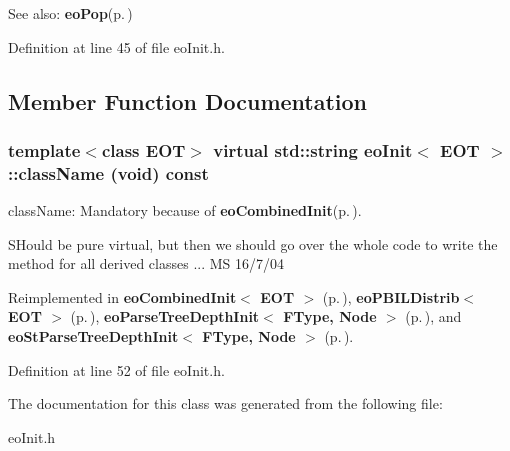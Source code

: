 \begin{Desc}
\item[See also:]{\bf eo\-Pop}{\rm (p.\,\pageref{classeo_pop})} \end{Desc}




Definition at line 45 of file eo\-Init.h.

\subsection{Member Function Documentation}
\subsubsection{\setlength{\rightskip}{0pt plus 5cm}template$<$class EOT$>$ virtual std::string {\bf eo\-Init}$<$ {\bf EOT} $>$::class\-Name (void) const\hspace{0.3cm}{\tt  [inline, virtual]}}\label{classeo_init_a0}


class\-Name: Mandatory because of {\bf eo\-Combined\-Init}{\rm (p.\,\pageref{classeo_combined_init})}. 

SHould be pure virtual, but then we should go over the whole code to write the method for all derived classes ... MS 16/7/04 

Reimplemented in {\bf eo\-Combined\-Init$<$ EOT $>$} {\rm (p.\,\pageref{classeo_combined_init_a4})}, {\bf eo\-PBILDistrib$<$ EOT $>$} {\rm (p.\,\pageref{classeo_p_b_i_l_distrib_a6})}, {\bf eo\-Parse\-Tree\-Depth\-Init$<$ FType, Node $>$} {\rm (p.\,\pageref{classeo_parse_tree_depth_init_a1})}, and {\bf eo\-St\-Parse\-Tree\-Depth\-Init$<$ FType, Node $>$} {\rm (p.\,\pageref{classeo_st_parse_tree_depth_init_a1})}.

Definition at line 52 of file eo\-Init.h.

The documentation for this class was generated from the following file:\begin{CompactItemize}
\item 
eo\-Init.h\end{CompactItemize}
